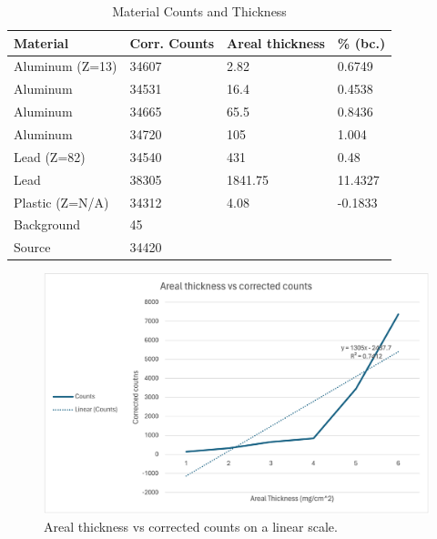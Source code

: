 \documentclass[twocolumn]{article}
\begin{document}
\begin{table}[h!]
    \centering
    \caption{Material Counts and Thickness}
    \begin{tabular}{|l|l|l|l|}
        \hline
        Material & Corr. Counts & Areal thickness & \% (bc.) \\
        \hline
        Aluminum (Z=13)  & 34607 & 2.82 & 0.6749 \\
        \hline
        Aluminum  & 34531 & 16.4 & 0.4538 \\
        \hline
        Aluminum & 34665 & 65.5 & 0.8436 \\
        \hline
        Aluminum & 34720 & 105 & 1.004 \\
        \hline
        Lead (Z=82)  & 34540 & 431 & 0.48 \\
        \hline
        Lead  & 38305 & 1841.75 & 11.4327 \\
        \hline
        Plastic (Z=N/A)  & 34312 & 4.08 & -0.1833 \\
        \hline
        Background & 45 & & \\
        \hline
        Source & 34420 & & \\
        \hline
    \end{tabular}
\end{table}

\begin{figure}[h!]
\includegraphics[scale=0.55]{bc_a.png}
\caption{\small{Areal thickness vs corrected counts on a linear scale.}}
\end{figure}
\end{document}
